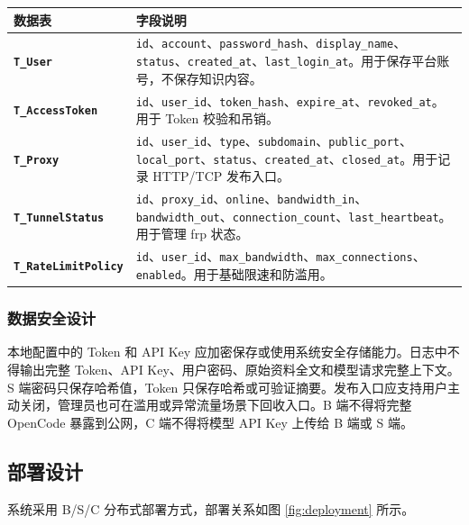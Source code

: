 \documentclass[UTF8,a4paper,12pt,fontset=fandol]{ctexart}
\newcommand{\code}[1]{\texttt{\footnotesize #1}}
\begin{document}
\begin{longtable}{>{\bfseries}p{3.2cm}p{11.0cm}}
\toprule
数据表 & 字段说明 \\
\midrule
\code{T\_User} & \code{id}、\code{account}、\code{password\_hash}、\code{display\_name}、\code{status}、\code{created\_at}、\code{last\_login\_at}。用于保存平台账号，不保存知识内容。 \\
\code{T\_AccessToken} & \code{id}、\code{user\_id}、\code{token\_hash}、\code{expire\_at}、\code{revoked\_at}。用于 Token 校验和吊销。 \\
\code{T\_Proxy} & \code{id}、\code{user\_id}、\code{type}、\code{subdomain}、\code{public\_port}、\code{local\_port}、\code{status}、\code{created\_at}、\code{closed\_at}。用于记录 HTTP/TCP 发布入口。 \\
\code{T\_TunnelStatus} & \code{id}、\code{proxy\_id}、\code{online}、\code{bandwidth\_in}、\code{bandwidth\_out}、\code{connection\_count}、\code{last\_heartbeat}。用于管理 frp 状态。 \\
\code{T\_RateLimitPolicy} & \code{id}、\code{user\_id}、\code{max\_bandwidth}、\code{max\_connections}、\code{enabled}。用于基础限速和防滥用。 \\
\bottomrule
\end{longtable}

\subsubsection{数据安全设计}
本地配置中的 Token 和 API Key 应加密保存或使用系统安全存储能力。日志中不得输出完整 Token、API Key、用户密码、原始资料全文和模型请求完整上下文。S 端密码只保存哈希值，Token 只保存哈希或可验证摘要。发布入口应支持用户主动关闭，管理员也可在滥用或异常流量场景下回收入口。B 端不得将完整 OpenCode 暴露到公网，C 端不得将模型 API Key 上传给 B 端或 S 端。

\subsection{部署设计}
系统采用 B/S/C 分布式部署方式，部署关系如图 \ref{fig:deployment} 所示。
\end{document}
